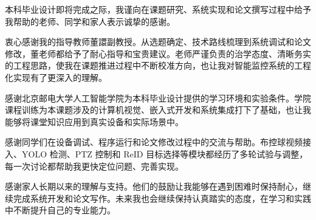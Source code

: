 \begin{acknowledgement}

本科毕业设计即将完成之际，我谨向在课题研究、系统实现和论文撰写过程中给予我帮助的老师、同学和家人表示诚挚的感谢。

衷心感谢我的指导教师董譞副教授。从选题确定、技术路线梳理到系统调试和论文修改，董老师都给予了耐心指导和宝贵建议。老师严谨负责的治学态度、清晰务实的工程思路，使我在课题推进过程中不断校准方向，也让我对智能监控系统的工程化实现有了更深入的理解。

感谢北京邮电大学人工智能学院为本科毕业设计提供的学习环境和实验条件。学院课程训练为本课题涉及的计算机视觉、嵌入式开发和系统集成打下了基础，也让我能够将课堂知识应用到真实设备和实际场景中。

感谢同学们在设备调试、程序运行和论文修改过程中的交流与帮助。布控球视频接入、YOLO 检测、PTZ 控制和 ReID 目标选择等模块都经历了多轮试验与调整，每一次讨论都帮助我更快定位问题、完善实现。

感谢家人长期以来的理解与支持。他们的鼓励让我能够在遇到困难时保持耐心，继续完成系统开发和论文写作。未来我也会继续保持认真踏实的态度，在学习和实践中不断提升自己的专业能力。

\end{acknowledgement}
